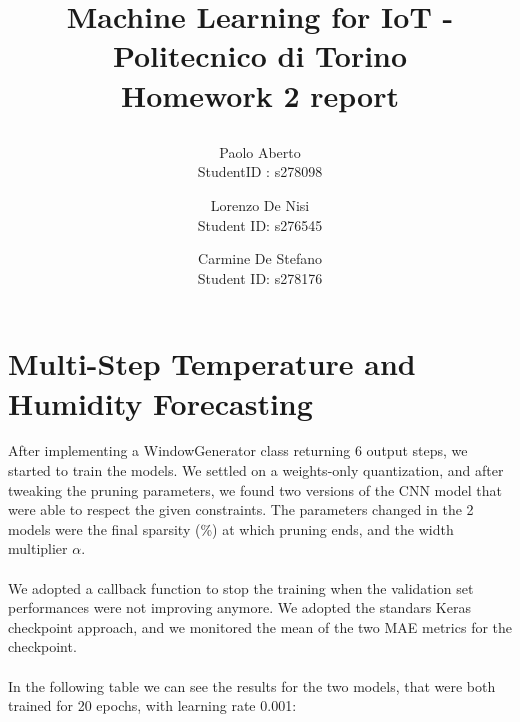 \documentclass{article}
\date{}
\begin{document}
\author{Paolo Aberto\\
StudentID : s278098\\

\and
Lorenzo De Nisi\\
Student ID: s276545\\

\and
Carmine De Stefano\\
Student ID: s278176\\
}

\justifying

\title{
    \vspace{0.8cm}
    
    Machine Learning for IoT - 
    Politecnico di Torino\\
    \vspace{.5cm}
    \Large \textbf{Homework 2 report}
    \vspace{.1cm}
}

\maketitle
\thispagestyle{empty} 
\vspace{-0.9cm}


\section{Multi-Step Temperature and Humidity Forecasting}
After implementing a WindowGenerator class returning 6 output steps, we started to train the models. We settled on a weights-only quantization, and after tweaking the pruning parameters, we found two versions of the CNN model that were able to respect the given constraints.
The parameters changed in the 2 models were the final sparsity (\%) at which pruning ends, and the width multiplier $\alpha$.
\\\\
We adopted a callback function to stop the training when the validation set performances were not improving anymore. We adopted the standars Keras checkpoint approach, and we monitored the mean of the two MAE metrics for the checkpoint. 
\\\\
In the following table we can see the results for the two models, that were both trained for 20 epochs, with learning rate 0.001:

\vspace{0.2cm}
\end{document}
